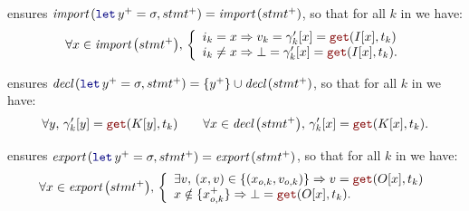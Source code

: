 \begin{skippableproof}
\begin{itemize}
\begin{itemize}
                         ensures
                        $\importSet{\decl{y^+}{\sigma}, stmt^+} = \importSet{stmt^+}$,
                        so that for all $k$ in \N we have:
                        \begin{equation*}
                            \forall x \in \importSet{stmt^+}, \,
                            \left\{\begin{array}{l}
                                i_k = x \Rightarrow v_k = \gamma'_k[x] = \getAt{I[x]}{t_k} \\
                                i_k \neq x \Rightarrow \bot = \gamma'_k[x] = \getAt{I[x]}{t_k}.
                            \end{array}\right.
                        \end{equation*}

                         ensures
                        $\declSet{\decl{y^+}{\sigma}, stmt^+} = \{y^+\} \cup \declSet{stmt^+}$, so
                        that for all $k$ in \N we have:
                        \begin{equation*}
                            \forall y, \, \gamma'_k[y] = \getAt{K[y]}{t_k} \qquad
                            \forall x \in \declSet{stmt^+}, \, \gamma'_k[x] = \getAt{K[x]}{t_k}.
                        \end{equation*}

                         ensures
                        $\exportSet{\decl{y^+}{\sigma}, stmt^+} = \exportSet{stmt^+}$, so that for
                        all $k$ in \N we have:
                        \begin{equation*}
                            \forall x \in \exportSet{stmt^+}, \,
                            \left\{\begin{array}{l}
                                \exists v, \, (x, v) \in \{(x_{o, k}, v_{o, k})\} \Rightarrow v = \getAt{O[x]}{t_k} \\
                                x \notin \{x_{o, k}^+\} \Rightarrow \bot = \getAt{O[x]}{t_k}.
                            \end{array}\right.
                        \end{equation*}


\end{itemize}
\end{itemize}
\end{skippableproof}
